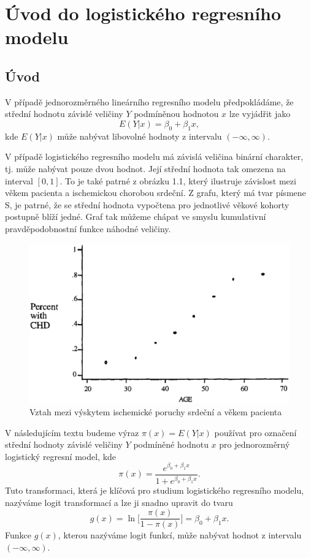 \chapter{Úvod do logistického regresního modelu}

\section{Úvod}

V případě jednorozměrného lineárního regresního modelu předpokládáme, že střední hodnotu závislé veličiny $Y$ podmíněnou hodnotou $x$ lze vyjádřit jako
\begin{equation}
E(Y | x) = \beta_0 + \beta_1 x,
\end{equation}
kde $E(Y | x)$ může nabývat libovolné hodnoty z intervalu $(-\infty, \infty)$.

V případě logistického regresního modelu má závislá veličina binární charakter, tj. může nabývat pouze dvou hodnot. Její střední hodnota tak omezena na interval $[0, 1]$. To je také patrné z obrázku 1.1, který ilustruje závislost mezi věkem pacienta a ischemickou chorobou srdeční. Z grafu, který má tvar písmene S, je patrné, že se střední hodnota vypočtena pro jednotlivé věkové kohorty postupně blíží jedné. Graf tak můžeme chápat ve smyslu kumulativní pravděpodobnostní funkce náhodné veličiny.

\begin{figure}[htp]
\centering
\includegraphics[scale = 0.35]{pictures/fig_1_2.eps}
\caption{Vztah mezi výskytem ischemické poruchy srdeční a věkem pacienta}
\label{fig_1_2}
\end{figure}

V následujícím textu budeme výraz $\pi(x) = E(Y | x)$ používat pro označení střední hodnoty závislé veličiny $Y$ podmíněné hodnotu $x$ pro jednorozměrný logistický regresní model, kde
\begin{equation}
\pi(x) = \frac{e^{\beta_0 + \beta_1 x}}{1 + e^{\beta_0 + \beta_1 x}}.
\end{equation}
Tuto transformaci, která je klíčová pro studium logistického regresního modelu, nazýváme logit transformací a lze ji snadno upravit do tvaru
\begin{equation}
g(x) = \ln \Big[\frac{\pi(x)}{1 - \pi(x)} \Big] = \beta_0 + \beta_1 x.
\end{equation}
Funkce $g(x)$, kterou nazýváme logit funkcí, může nabývat hodnot z intervalu $(-\infty, \infty)$.

